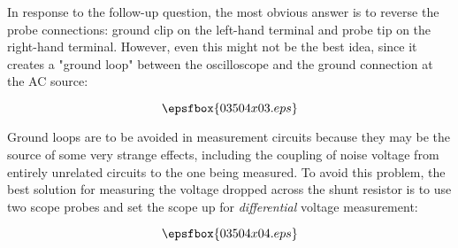 In response to the follow-up question, the most obvious answer is to reverse the probe connections: ground clip on the left-hand terminal and probe tip on the right-hand terminal.  However, even this might not be the best idea, since it creates a "ground loop" between the oscilloscope and the ground connection at the AC source:

$$\epsfbox{03504x03.eps}$$

Ground loops are to be avoided in measurement circuits because they may be the source of some very strange effects, including the coupling of noise voltage from entirely unrelated circuits to the one being measured.  To avoid this problem, the best solution for measuring the voltage dropped across the shunt resistor is to use two scope probes and set the scope up for {\it differential} voltage measurement:

$$\epsfbox{03504x04.eps}$$




